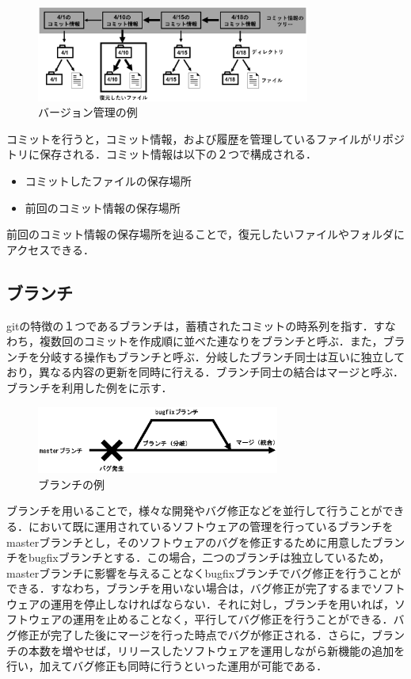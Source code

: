 \documentclass[a4j,9pt,twocolumn]{jsarticle}
\begin{document}
\begin{figure}[h]
\centering
\includegraphics[width=90mm]{img/tree.eps}
\caption{バージョン管理の例}
\label{tree}
\end{figure}

コミットを行うと，コミット情報，および履歴を管理しているファイルがリポジトリに保存される．コミット情報は以下の２つで構成される．

\begin{itemize}
\item コミットしたファイルの保存場所
\item 前回のコミット情報の保存場所
\end{itemize}

前回のコミット情報の保存場所を辿ることで，復元したいファイルやフォルダにアクセスできる．

\subsection{ブランチ}
gitの特徴の１つであるブランチは，蓄積されたコミットの時系列を指す．すなわち，複数回のコミットを作成順に並べた連なりをブランチと呼ぶ．また，ブランチを分岐する操作もブランチと呼ぶ．分岐したブランチ同士は互いに独立しており，異なる内容の更新を同時に行える．ブランチ同士の結合はマージと呼ぶ．ブランチを利用した例をに示す．

\begin{figure}[h]
\centering
\includegraphics[width=80mm]{img/branch.eps}
\caption{ブランチの例}
\label{branch_ex}
\end{figure}

ブランチを用いることで，様々な開発やバグ修正などを並行して行うことができる．において既に運用されているソフトウェアの管理を行っているブランチをmasterブランチとし，そのソフトウェアのバグを修正するために用意したブランチをbugfixブランチとする．この場合，二つのブランチは独立しているため，masterブランチに影響を与えることなくbugfixブランチでバグ修正を行うことができる．すなわち，ブランチを用いない場合は，バグ修正が完了するまでソフトウェアの運用を停止しなければならない．それに対し，ブランチを用いれば，ソフトウェアの運用を止めることなく，平行してバグ修正を行うことができる．バグ修正が完了した後にマージを行った時点でバグが修正される．さらに，ブランチの本数を増やせば，リリースしたソフトウェアを運用しながら新機能の追加を行い，加えてバグ修正も同時に行うといった運用が可能である．
\end{document}
